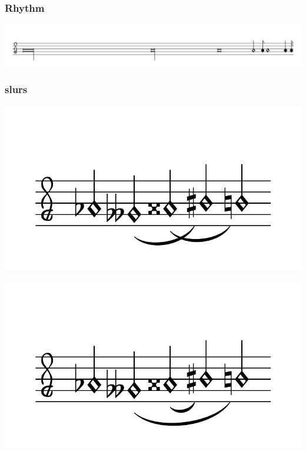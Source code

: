 \documentclass{article}
\begin{document}
    \subsubsection{Rhythm}
        \includegraphics[scale=0.3]{figures_tests/pdf/smens/rhythm1.pdf}

    \subsubsection{slurs}
        \includegraphics[scale=0.6]{figures_tests/pdf/smens/slur1.pdf}


        \includegraphics[scale=0.6]{figures_tests/pdf/smens/slur2.pdf}
\end{document}
